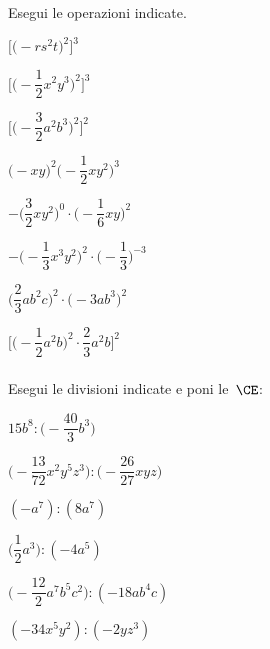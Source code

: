 \begin{esercizio}
 \label{ese:9.19}
 Esegui le operazioni indicate.
\begin{multicols}{2}
\begin{enumeratea}
\spazielenx
 \item $\bigg[\big(-rs^{2}t\big)^{2}\bigg]^{3}$
 \item $\Bigg[\bigg(-{\dfrac{1}{2}}x^{2}y^{3}\bigg)^{2}\Bigg]^{3}$
 \item $\Bigg[\bigg(-{\dfrac{3}{2}}a^{2}b^{3}\bigg)^{2}\Bigg]^{2}$
 \item $\big(-xy\big)^{2}\bigg(-{\dfrac{1}{2}}xy^{2}\bigg)^{3}$
 \item 
$-\bigg(\dfrac{3}{2}xy^{2}\bigg)^{0}\cdot\bigg(-{\dfrac{1}{6}}xy\bigg)^{2}$
 \item 
$-\bigg(-{\dfrac{1}{3}}x^{3}y^{2}\bigg)^{2}\cdot
\bigg(-{\dfrac{1}{3}}\bigg)^{-3}$
 \item $\bigg(\dfrac{2}{3}ab^{2}c\bigg)^{2}\cdot\big(-3ab^{3}\big)^{2}$
 \item 
$\Bigg[\bigg(-{\dfrac{1}{2}}a^{2}b\bigg)^{2}\cdot{\dfrac{2}{3}a^{2}b}\Bigg]^{2}$
\end{enumeratea}
\end{multicols}
\end{esercizio}

\subsubsection*{}

\begin{esercizio}
 \label{ese:9.21}
Esegui le divisioni indicate e poni le~$\CE$:
\begin{multicols}{2}
\begin{enumeratea}
\spazielenx
 \item $15b^{8}:\bigg(-{\dfrac{40}{3}}b^{3}\bigg)$
 \item 
$\bigg(-{\dfrac{13}{72}}x^{2}y^{5}z^{3}\bigg):\bigg(-{\dfrac{26}{27}}xyz\bigg)$
 \item $(-a^{7}):(8a^{7})$
 \item $\bigg(\dfrac{1}{2}a^{3}\bigg):(-4a^{5})$
 \item $\bigg(-{\dfrac{12}{2}}a^{7}b^{5}c^{2}\bigg):(-18ab^{4}c)$
 \item $(-34x^{5}y^{2}):(-2yz^{3})$
\end{enumeratea}
\end{multicols}
\end{esercizio}

